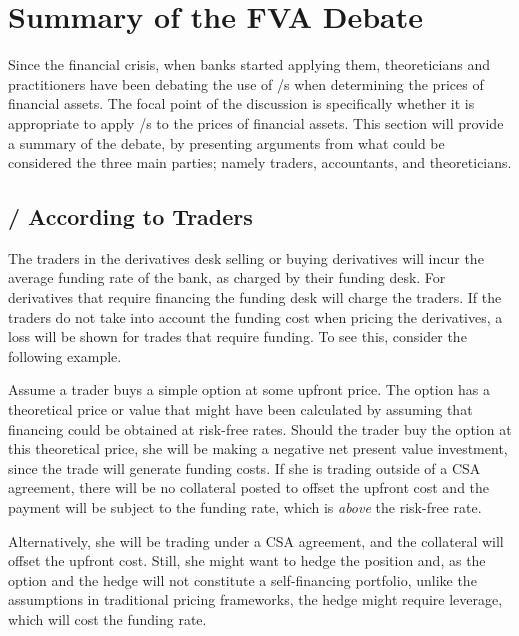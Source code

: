 \documentclass[main.tex]{subfiles}
\begin{document}
    \section{Summary of the FVA Debate}
        Since the financial crisis, when banks started applying them,
        theoreticians and practitioners have been debating the use of \FVA/s
        when determining the prices of financial assets.
        The focal point of the discussion is specifically 
        whether it is appropriate to apply \FVA/s to the prices of financial assets.
        This section will provide a summary of the debate, 
        by presenting arguments from what could be considered the three main parties;
        namely traders, accountants, and theoreticians.

        \subsection{\FVA/ According to Traders}
            The traders in the derivatives desk selling or buying derivatives 
            will incur the average funding rate of the bank, as charged by their funding desk.
            For derivatives that require financing the funding desk will charge the traders.
            If the traders do not take into account the funding cost when pricing the derivatives,
            a loss will be shown for trades that require funding.
            To see this, consider the following example.

            \begin{example}
            Assume a trader buys a simple option at some upfront price.
            The option has a theoretical price or value that might have been calculated by assuming
            that financing could be obtained at risk-free rates. 
            Should the trader buy the option at this theoretical price, 
            she will be making a negative net present value investment, 
            since the trade will generate funding costs. 
            If she is trading outside of a CSA agreement, there will be no collateral posted
            to offset the upfront cost and the payment will be subject to the
            funding rate, which is \textit{above} the risk-free rate. 
            
            Alternatively, she will be trading under a CSA agreement,
            and the collateral will offset the upfront cost.
            Still, she might want to hedge the position and, as the option and the hedge
            will not constitute a self-financing portfolio, 
            unlike the assumptions in traditional pricing frameworks,
            the hedge might require leverage, which will cost the funding rate.
            \end{example}
\end{document}
